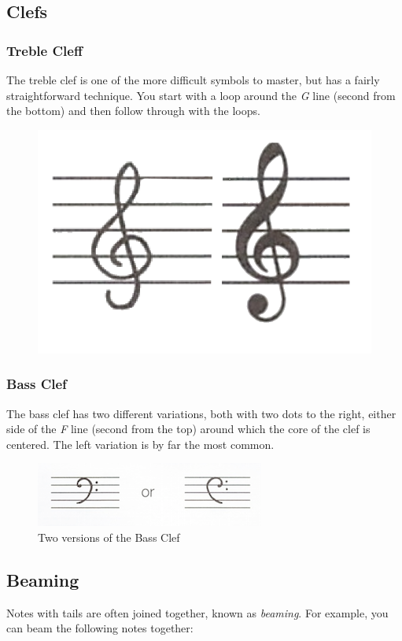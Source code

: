 \subsection{Clefs}

\subsubsection{Treble Cleff}

The treble clef is one of the more difficult symbols to master, but has a fairly straightforward technique. You start with a loop around the \emph{G} line (second from the bottom) and then follow through with the loops.

\begin{figure}[h!]
  \includegraphics[width=0.3\linewidth]{gfx/basic/treble-clef.png}
  \centering
  \label{fig:TrebleClef}
\end{figure}

\subsubsection{Bass Clef}

The bass clef has two different variations, both with two dots to the right, either side of the \emph{F} line (second from the top) around which the core of the clef is centered. The left variation is by far the most common.

\begin{figure}[h!]
  \includegraphics[width=0.5\linewidth]{gfx/basic/bass-clef.png}
  \centering
  \caption{Two versions of the Bass Clef}
  \label{fig:BassClef}
\end{figure}

\subsection{Beaming}

Notes with tails are often joined together, known as \emph{beaming}. For example, you can beam the following notes together:

